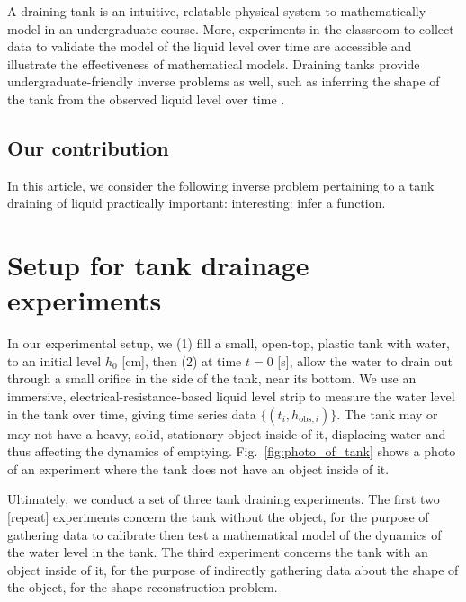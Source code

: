 \documentclass[openacc]{rsproca_new}%
\begin{document}

A draining tank is an intuitive, relatable physical system to mathematically model in an undergraduate course. 
More, experiments in the classroom to collect data to validate the model of the liquid level over time are accessible and illustrate the effectiveness of mathematical models.
\cite{farmer1992physical,driver1998torricelli,brady2009siphons,rother2024modelling,paldy1963apparatus,ivanov2014testing,williams2021vessel,pavesi2019investigating,planinvsivc2011holes,saleta2005experimental,lopac2015water,powell2012carrying}
Draining tanks provide undergraduate-friendly inverse problems \cite{groetsch1993inverse,neto2012introduction,tarantola2005inverse} as well, such as inferring the shape of the tank from the observed liquid level over time \cite{groetsch1993inverse,groetsch1999inverse}. 

\subsection{Our contribution}
In this article, we consider the following inverse problem pertaining to a tank draining of liquid
practically important:
interesting: infer a function. 


\section{Setup for tank drainage experiments} \label{sec:expt}
In our experimental setup, we (1) fill a small, open-top, plastic tank with water, to an initial level $h_0$ [cm], then (2) at time $t=0$ [s], allow the water to drain out through a small orifice in the side of the tank, near its bottom. 
We use an immersive, electrical-resistance-based liquid level strip to measure the water level in the tank over time, giving time series data $\{(t_i, h_{\text{obs}, i}) \}$. The tank may or may not have a heavy, solid, stationary object inside of it, displacing water and thus affecting the dynamics of emptying. Fig.~\ref{fig:photo_of_tank} shows a photo of an experiment where the tank does not have an object inside of it.

Ultimately, we conduct a set of three tank draining experiments. The first two [repeat] experiments concern the tank without the object, for the purpose of gathering data to calibrate then test a mathematical model of the dynamics of the water level in the tank. The third experiment concerns the tank with an object inside of it, for the purpose of indirectly gathering data about the shape of the object, for the shape reconstruction problem.
\end{document}
